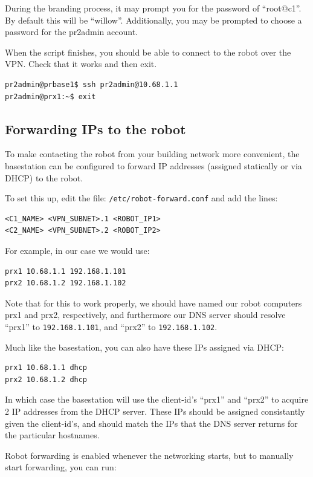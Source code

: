 During the branding process, it may prompt you for the password of
``root@c1''.  By default this will be ``willow''.  Additionally, you
may be prompted to choose a password for the pr2admin account.

When the script finishes, you should be able to connect to the robot
over the VPN.  Check that it works and then exit.
\begin{verbatim}
pr2admin@prbase1$ ssh pr2admin@10.68.1.1
pr2admin@prx1:~$ exit
\end{verbatim}

\subsection{Forwarding IPs to the robot}

To make contacting the robot from your building network more convenient,
the basestation can be configured to forward IP addresses (assigned
statically or via DHCP) to the robot.

To set this up, edit the file: \texttt{/etc/robot-forward.conf} and add the lines:

\begin{verbatim}
<C1_NAME> <VPN_SUBNET>.1 <ROBOT_IP1>
<C2_NAME> <VPN_SUBNET>.2 <ROBOT_IP2>
\end{verbatim}

For example, in our case we would use:

\begin{verbatim}
prx1 10.68.1.1 192.168.1.101
prx2 10.68.1.2 192.168.1.102
\end{verbatim}

Note that for this to work properly, we should have named our robot
computers prx1 and prx2, respectively, and furthermore our DNS server
should resolve ``prx1'' to \texttt{192.168.1.101}, and ``prx2'' to
\texttt{192.168.1.102}.

Much like the basestation, you can also have these IPs assigned via DHCP:

\begin{verbatim}
prx1 10.68.1.1 dhcp
prx2 10.68.1.2 dhcp
\end{verbatim}

In which case the basestation will use the client-id's ``prx1'' and
``prx2'' to acquire 2 IP addresses from the DHCP server.  These IPs
should be assigned consistantly given the client-id's, and should
match the IPs that the DNS server returns for the particular hostnames.  

Robot forwarding is enabled whenever the networking starts, but to
manually start forwarding, you can run:

